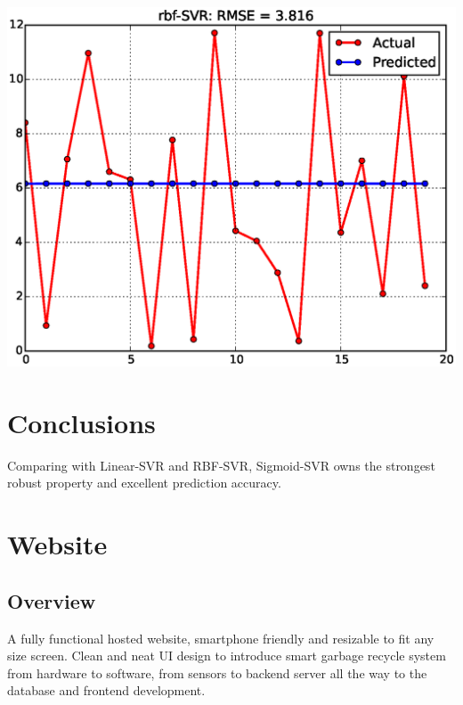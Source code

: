 \documentclass[a0b,portrait]{a0poster}
\begin{document}
\begin{multicols}{3}
\begin{center}
\end{center}
\begin{center}
\includegraphics[width=\linewidth]{rbf-SVR.eps}
\end{center}

\color{SaddleBrown} %

\section*{Conclusions}
Comparing with Linear-SVR and RBF-SVR, Sigmoid-SVR owns the strongest robust property and excellent prediction accuracy.

\color{black}
\section*{Website}
\subsection*{Overview}
A fully functional hosted website, smartphone friendly and resizable to fit any size screen. Clean and neat UI design to introduce smart garbage recycle system from hardware to software, from sensors to backend server all the way to the database and frontend development.


\end{multicols}
\end{document}
